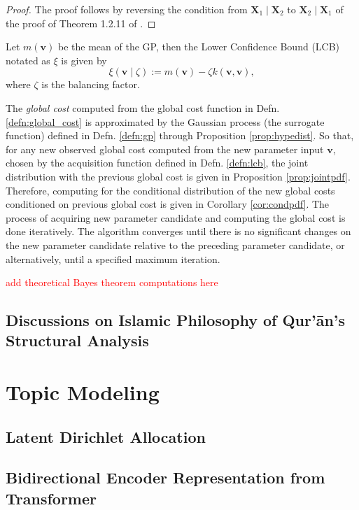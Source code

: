 \begin{proof}
    The proof follows by reversing the condition from $\mathbf{X}_1\mid\mathbf{X}_2$ to $\mathbf{X}_2\mid\mathbf{X}_1$ of the proof of Theorem 1.2.11 of \cite{muirhead2005}.
\end{proof}
\begin{defn}\label{defn:lcb}
    Let $m(\mathbf{v})$ be the mean of the GP, then the Lower Confidence Bound (LCB) notated as $\xi$ is given by
    \begin{equation}
        \xi(\mathbf{v}\mid\zeta):=m(\mathbf{v})-\zeta k(\mathbf{v},\mathbf{v}),
    \end{equation}
    where $\zeta$ is the balancing factor.
\end{defn}
The \textit{global cost} computed from the global cost function in Defn. \ref{defn:global_cost} is approximated by the Gaussian process (the surrogate function) defined in Defn. \ref{defn:gp} through Proposition \ref{prop:hypedist}. So that, for any new observed global cost computed from the new parameter input $\mathbf{v}$, chosen by the acquisition function defined in Defn. \ref{defn:lcb}, the joint distribution with the previous global cost is given in Proposition \ref{prop:jointpdf}. Therefore, computing for the conditional distribution of the new global costs conditioned on previous global cost is given in Corollary \ref{cor:condpdf}. The process of acquiring new parameter candidate and computing the global cost is done iteratively. The algorithm converges until there is no significant changes on the new parameter candidate relative to the preceding parameter candidate, or alternatively, until a specified maximum iteration.
\begin{center}
    \textcolor{red}{add theoretical Bayes theorem computations here}
\end{center}
\subsection{Discussions on Islamic Philosophy of Qur'\=an's Structural Analysis}
\newpage
\section{Topic Modeling}\label{sec:ch4_topic_modeling_result}
\subsection{Latent Dirichlet Allocation}
\subsection{Bidirectional Encoder Representation from Transformer}
